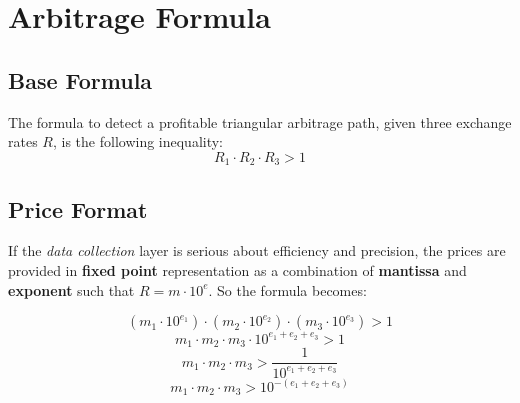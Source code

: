 \documentclass[11pt]{article}
\begin{document}
\begin{center}
\end{center}

\section{Arbitrage Formula}

\subsection{Base Formula}
The formula to detect a profitable triangular arbitrage path, given three exchange rates $R$, is the following inequality:
\begin{equation}
    R_{1} \cdot R_{2} \cdot R_{3} > 1
\end{equation}

\subsection{Price Format}
If the \textit{data collection} layer is serious about efficiency and precision, the prices are provided in \textbf{fixed point} representation as a combination of \textbf{mantissa} and \textbf{exponent} such that $R = m \cdot 10^{e}$. So the formula becomes:

\begin{equation}
    \left( m_1 \cdot 10^{e_1} \right) \cdot \left( m_2 \cdot 10^{e_2} \right) \cdot \left( m_3 \cdot 10^{e_3} \right) > 1
\end{equation}
\begin{equation}
    m_1 \cdot m_2 \cdot m_3 \cdot 10^{e_1 + e_2 + e_3} > 1
\end{equation}
\begin{equation}
    m_1 \cdot m_2 \cdot m_3 > \frac{1}{10^{e_1 + e_2 + e_3}}
\end{equation}
\begin{equation}
    m_1 \cdot m_2 \cdot m_3 > 10^{-(e_1 + e_2 + e_3)}
\end{equation}
\end{document}
